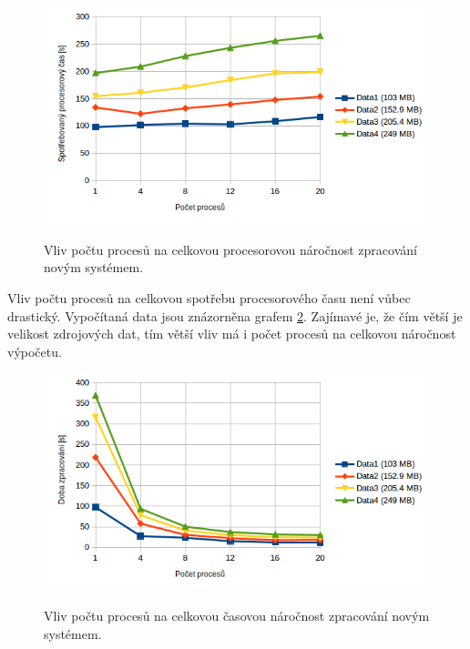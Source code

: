 \begin{figure}[H]
    \begin{center}
        \label{graph:graph_realny_cas_vertikalizace}
        \includegraphics[width=1.0\textwidth]{obrazky-figures/graph_procesorovy_cas_vertikalizace.png}
        \caption{Vliv počtu procesů na celkovou procesorovou náročnost zpracování novým systémem.}
    \end{center}
\end{figure}

Vliv počtu procesů na celkovou spotřebu procesorového času není vůbec drastický. Vypočítaná data
jsou znázorněna grafem \ref{graph:graph_procesorovy_cas_vertikalizace}. Zajímavé je,
že čím větší je velikost zdrojových dat, tím větší vliv má i počet procesů na
celkovou náročnost výpočetu.

\begin{figure}[H]
    \begin{center}
        \label{graph:graph_procesorovy_cas_vertikalizace}
        \includegraphics[width=1.0\textwidth]{obrazky-figures/graph_realny_cas_vertikalizace.png}
        \caption{Vliv počtu procesů na celkovou časovou náročnost zpracování novým systémem.}
    \end{center}
\end{figure}


